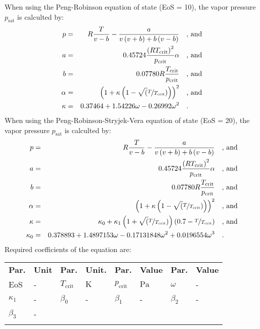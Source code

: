 %
When using the Peng-Robinson equation of state (EoS = 10), the vapor pressure $p_\mathrm{sat}$ is calculted by:
%
\begin{equation*}
	\begin{split}
		p &=& R \frac{T}{v - b} - \frac{a}{v \left(v + b\right) + b \left(v - b\right)} & \quad\text{, and} \\
		a &=& 0.45724 \frac{\left(R T_\mathrm{crit} \right)^2}{p_\mathrm{crit}} \alpha & \quad\text{, and} \\
		b &=& 0.07780 R \frac{T_\mathrm{crit}}{p_\mathrm{crit}} & \quad\text{, and} \\
		\alpha &=& \left(1 + \kappa \left(1 - \sqrt(\nicefrac{T}{T_\mathrm{crit}}) \right) \right)^2 & \quad\text{, and} \\
		\kappa &=& 0.37464 + 1.54226 \omega - 0.26992 \omega^2 & \quad\text{.}
	\end{split}
\end{equation*}
%
When using the Peng-Robinson-Stryjek-Vera equation of state (EoS = 20), the vapor pressure $p_\mathrm{sat}$ is calculted by:
%
\begin{equation*}
\begin{split}
	p &=& R \frac{T}{v - b} - \frac{a}{v \left(v + b\right) + b \left(v - b\right)} & \quad\text{, and} \\
	a &=& 0.45724 \frac{\left(R T_{\mathrm{crit}} \right)^2}{p_{\mathrm{crit}}} \alpha & \quad\text{, and} \\
	b &=& 0.07780 R \frac{T_{\mathrm{crit}}}{p_{\mathrm{crit}}} & \quad\text{, and} \\
	\alpha &=& \left(1 + \kappa \left(1 - \sqrt(\nicefrac{T}{T_{\mathrm{crit}}}) \right) \right)^2 & \quad\text{, and} \\
	\kappa &=& \kappa_{0} + \kappa_{1} \left(1 + \sqrt(\nicefrac{T}{T_{\mathrm{crit}}}) \right) \left(0.7 - \nicefrac{T}{T_{\mathrm{crit}}}\right)  & \quad\text{, and} \\
	\kappa_{0} &=& 0.378893 + 1.4897153 \omega - 0.17131848 \omega^2 + 0.0196554 \omega^3 & \quad\text{.}
\end{split}
\end{equation*}
%
Required coefficients of the equation are:
%
\begin{longtable}[l]{ll|ll|ll|ll}
\toprule
\addlinespace
\textbf{Par.} & \textbf{Unit} & \textbf{Par.} &	\textbf{Unit.} & \textbf{Par.} & \textbf{Value} & \textbf{Par.} & \textbf{Value} \\
\addlinespace
\midrule
\endhead

\bottomrule
\endfoot
\bottomrule
\endlastfoot
\addlinespace

EoS & - & $T_\mathrm{crit}$ & $\si{\kelvin}$ & $p_\mathrm{crit}$ & $\si{\pascal}$ & $\omega$ & - \\
$\kappa_1$ & - & $\beta_0$ & - & $\beta_1$ & - & $\beta_2$ & - \\
$\beta_3$ & - & & & & & & \\

\addlinespace
\end{longtable}
